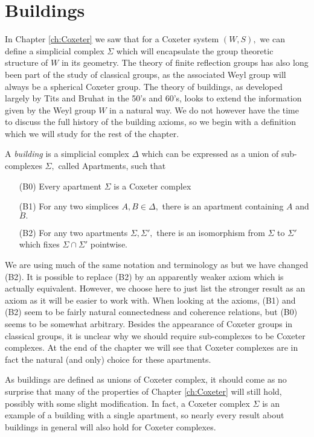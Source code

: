 \documentclass[class=book, crop=false,12 pt]{standalone}
\begin{document}
\chapter{Buildings}
\label{ch:buildings}
In Chapter \ref{ch:Coxeter} we saw that for a Coxeter system $(W,S),$ we can define a simplicial complex $\Sigma$ which will encapsulate the group theoretic structure of $W$ in its geometry. The theory of finite reflection groups has also long been part of the study of classical groups, as the associated Weyl group will always be a spherical Coxeter group. The theory of buildings, as developed largely by Tits and Bruhat in the 50's and 60's, looks to extend the information given by the Weyl group $W$ in a natural way. We do not however have the time to discuss the full history of the building axioms, so we begin with a definition which we will study for the rest of the chapter.

\begin{defn}
	\label{defn:building}
	A \emph{building} is a simplicial complex $\Delta$ which can be expressed as a union of sub-complexes $\Sigma,$ called Apartments, such that
	\begin{itemize}
		\item[(B0)] Every apartment $\Sigma$ is a Coxeter complex
		\item[(B1)] For any two simplices $A,B\in \Delta,$ there is an apartment containing $A$ and $B.$
		\item[(B2)] For any two apartments $\Sigma,\Sigma',$ there is an isomorphism from $\Sigma$ to $\Sigma'$ which fixes $\Sigma\cap \Sigma'$ pointwise.
	\end{itemize}
\end{defn}

We are using much of the same notation and terminology as \cite{buildings} but we have changed (B2). It is possible to replace (B2) by an apparently weaker axiom which is actually equivalent. However, we choose here to just list the stronger result as an axiom as it will be easier to work with. When looking at the axioms, (B1) and (B2) seem to be fairly natural connectedness and coherence relations, but (B0) seems to be somewhat arbitrary. Besides the appearance of Coxeter groups in classical groups, it is unclear why we should require sub-complexes to be Coxeter complexes. At the end of the chapter we will see that Coxeter complexes are in fact the natural (and only) choice for these apartments.

As buildings are defined as unions of Coxeter complex, it should come as no surprise that many of the properties of Chapter \ref{ch:Coxeter} will still hold, possibly with some slight modification. In fact, a Coxeter complex $\Sigma$ is an example of a building with a single apartment, so nearly every result about buildings in general will also hold for Coxeter complexes.
\end{document}
